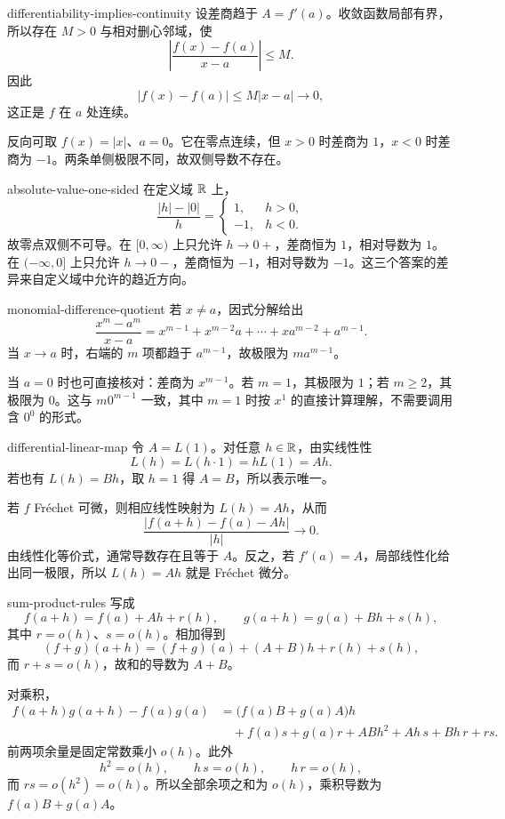 \begin{solution}{differentiability-implies-continuity}
设差商趋于 \(A=f'(a)\)。收敛函数局部有界，所以存在 \(M>0\) 与相对删心邻域，使
\[
 \left|\frac{f(x)-f(a)}{x-a}\right|\le M.
\]
因此
\[
 |f(x)-f(a)|\le M|x-a|\longrightarrow0,
\]
这正是 \(f\) 在 \(a\) 处连续。

反向可取 \(f(x)=|x|\)、\(a=0\)。它在零点连续，但 \(x>0\) 时差商为 \(1\)，\(x<0\) 时差商为 \(-1\)。两条单侧极限不同，故双侧导数不存在。
\end{solution}

\begin{solution}{absolute-value-one-sided}
在定义域 \(\mathbb{R}\) 上，
\[
 \frac{|h|-|0|}{h}
 =\begin{cases}
  1,&h>0,\\
  -1,&h<0.
 \end{cases}
\]
故零点双侧不可导。在 \([0,\infty)\) 上只允许 \(h\to0+\)，差商恒为 \(1\)，相对导数为 \(1\)。在 \((-\infty,0]\) 上只允许 \(h\to0-\)，差商恒为 \(-1\)，相对导数为 \(-1\)。这三个答案的差异来自定义域中允许的趋近方向。
\end{solution}

\begin{solution}{monomial-difference-quotient}
若 \(x\ne a\)，因式分解给出
\[
 \frac{x^m-a^m}{x-a}
 =x^{m-1}+x^{m-2}a+\cdots+xa^{m-2}+a^{m-1}.
\]
当 \(x\to a\) 时，右端的 \(m\) 项都趋于 \(a^{m-1}\)，故极限为 \(ma^{m-1}\)。

当 \(a=0\) 时也可直接核对：差商为 \(x^{m-1}\)。若 \(m=1\)，其极限为 \(1\)；若 \(m\ge2\)，其极限为 \(0\)。这与 \(m0^{m-1}\) 一致，其中 \(m=1\) 时按 \(x^1\) 的直接计算理解，不需要调用含 \(0^0\) 的形式。
\end{solution}

\begin{solution}{differential-linear-map}
令 \(A=L(1)\)。对任意 \(h\in\mathbb{R}\)，由实线性性
\[
 L(h)=L(h\cdot1)=hL(1)=Ah.
\]
若也有 \(L(h)=Bh\)，取 \(h=1\) 得 \(A=B\)，所以表示唯一。

若 \(f\) Fréchet 可微，则相应线性映射为 \(L(h)=Ah\)，从而
\[
 \frac{|f(a+h)-f(a)-Ah|}{|h|}\to0.
\]
由线性化等价式，通常导数存在且等于 \(A\)。反之，若 \(f'(a)=A\)，局部线性化给出同一极限，所以 \(L(h)=Ah\) 就是 Fréchet 微分。
\end{solution}

\begin{solution}{sum-product-rules}
写成
\[
 f(a+h)=f(a)+Ah+r(h),\qquad
 g(a+h)=g(a)+Bh+s(h),
\]
其中 \(r=o(h)\)、\(s=o(h)\)。相加得到
\[
 (f+g)(a+h)=(f+g)(a)+(A+B)h+r(h)+s(h),
\]
而 \(r+s=o(h)\)，故和的导数为 \(A+B\)。

对乘积，
\begin{align*}
 f(a+h)g(a+h)-f(a)g(a)
 &=\bigl(f(a)B+g(a)A\bigr)h\\
 &\quad+f(a)s+g(a)r+ABh^2+Ah\,s+Bh\,r+rs.
\end{align*}
前两项余量是固定常数乘小 \(o(h)\)。此外
\[
 h^2=o(h),\qquad h\,s=o(h),\qquad h\,r=o(h),
\]
而 \(rs=o(h^2)=o(h)\)。所以全部余项之和为 \(o(h)\)，乘积导数为 \(f(a)B+g(a)A\)。
\end{solution}

